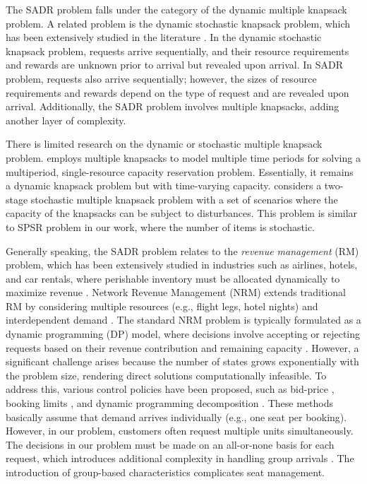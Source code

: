 The SADR problem falls under the category of the dynamic multiple knapsack problem. A related problem is the dynamic stochastic knapsack problem, which has been extensively studied in the literature \citep{kleywegt1998dynamic, kleywegt2001dynamic, papastavrou1996dynamic}. In the dynamic stochastic knapsack problem, requests arrive sequentially, and their resource requirements and rewards are unknown prior to arrival but revealed upon arrival. In SADR problem, requests also arrive sequentially; however, the sizes of resource requirements and rewards depend on the type of request and are revealed upon arrival. Additionally, the SADR problem involves multiple knapsacks, adding another layer of complexity.


There is limited research on the dynamic or stochastic multiple knapsack problem. \citep{perry2009approximate} employs multiple knapsacks to model multiple time periods for solving a multiperiod, single-resource capacity reservation problem. Essentially, it remains a dynamic knapsack problem but with time-varying capacity. \citep{tonissen2017column} considers a two-stage stochastic multiple knapsack problem with a set of scenarios where the capacity of the knapsacks can be subject to disturbances. This problem is similar to SPSR problem in our work, where the number of items is stochastic.


Generally speaking, the SADR problem relates to the \textit{revenue management} (RM) problem, which has been extensively studied in industries such as airlines, hotels, and car rentals, where perishable inventory must be allocated dynamically to maximize revenue \citep{van2005introduction}. Network Revenue Management (NRM) extends traditional RM by considering multiple resources (e.g., flight legs, hotel nights) and interdependent demand \citep{williamson1992airline}. The standard NRM problem is typically formulated as a dynamic programming (DP) model, where decisions involve accepting or rejecting requests based on their revenue contribution and remaining capacity \citep{talluri1998analysis}. However, a significant challenge arises because the number of states grows exponentially with the problem size, rendering direct solutions computationally infeasible. To address this, various control policies have been proposed, such as bid-price \citep{adelman2007dynamic, bertsimas2003revenue}, booking limits \citep{gallego1997multiproduct}, and dynamic programming decomposition \citep{talluri2006theory, liu2008choice}. These methods basically assume that demand arrives individually (e.g., one seat per booking). However, in our problem, customers often request multiple units simultaneously. The decisions in our problem must be made on an all-or-none basis for each request, which introduces additional complexity in handling group arrivals \citep{talluri2006theory}. The introduction of group-based characteristics complicates seat management.



